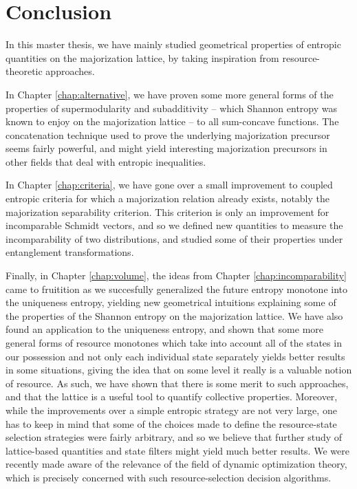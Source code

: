 \chapter{Conclusion}

In this master thesis, we have mainly studied geometrical properties of entropic quantities on the majorization lattice, by taking inspiration from resource-theoretic approaches.

In Chapter \ref{chap:alternative}, we have proven some more general forms of the properties of supermodularity and subadditivity -- which Shannon entropy was known to enjoy on the majorization lattice -- to all sum-concave functions. The concatenation technique used to prove the underlying majorization precursor seems fairly powerful, and might yield interesting majorization precursors in other fields that deal with entropic inequalities.

In Chapter \ref{chap:criteria}, we have gone over a small improvement to coupled entropic criteria for which a majorization relation already exists, notably the majorization separability criterion. This criterion is only an improvement for incomparable Schmidt vectors, and so we defined new quantities to measure the incomparability of two distributions, and studied some of their properties under entanglement transformations.

Finally, in Chapter \ref{chap:volume}, the ideas from Chapter \ref{chap:incomparability} came to fruitition as we succesfully generalized the future entropy monotone into the uniqueness entropy, yielding new geometrical intuitions explaining some of the properties of the Shannon entropy on the majorization lattice. We have also found an application to the uniqueness entropy, and shown that some more general forms of resource monotones which take into account all of the states in our possession and not only each individual state separately yields better results in some situations, giving the idea that on some level it really is a valuable notion of resource. As such, we have shown that there is some merit to such approaches, and that the lattice is a useful tool to quantify collective properties. Moreover, while the improvements over a simple entropic strategy are not very large, one has to keep in mind that some of the choices made to define the resource-state selection strategies were fairly arbitrary, and so we believe that further study of lattice-based quantities and state filters might yield much better results. We were recently made aware of the relevance of the field of dynamic optimization theory, which is precisely concerned with such resource-selection decision algorithms.

